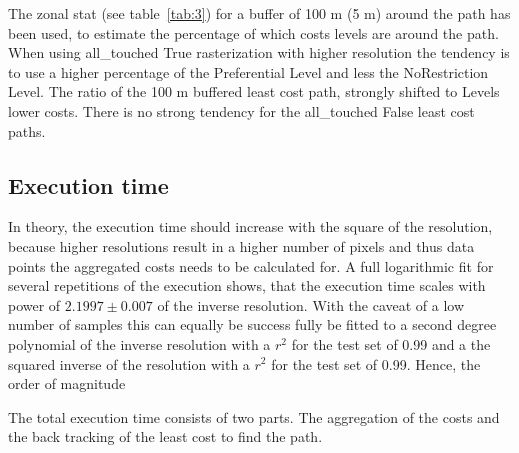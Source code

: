 The zonal stat (see table~\ref{tab:3}) for a buffer of 100 m (5 m) around the path has been used, to estimate the
percentage of which costs levels are around the path.
When using all\_touched True rasterization with higher resolution the tendency is to use a higher percentage of the
Preferential Level and less the NoRestriction Level.
The ratio of the 100 m buffered least cost path, strongly shifted  to Levels lower costs.
There is no strong tendency for the all\_touched False least cost paths.

\subsection{Execution time}\label{subsec:execution-time}
In theory, the execution time should increase with the square of the resolution, because higher resolutions result in a higher number of pixels and thus data points the aggregated costs needs to be calculated for. 
A full logarithmic fit for several repetitions of the execution shows, that the execution time scales with power of $2.1997  \pm 0.007$ of the inverse resolution. 
With the caveat of a low number of samples this can equally be success fully be fitted to a second degree polynomial of the inverse resolution with a $r^2$ for the test set of 0.99 and a the squared inverse of the resolution with a $r^2$ for the test set of 0.99.
Hence, the order of magnitude

The total execution time consists of two parts. 
The aggregation of the costs and the back tracking of the least cost to find the path.





\setlength{\tabcolsep}{10pt}

